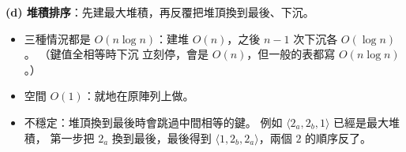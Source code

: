 \begin{pastsoln}
\textbf{(d) 堆積排序}：先建最大堆積，再反覆把堆頂換到最後、下沉。
\begin{itemize}
\item 三種情況都是 $O(n \log n)$：建堆 $O(n)$，之後 $n - 1$ 次下沉各 $O(\log n)$。 （鍵值全相等時下沉
立刻停，會是 $O(n)$，但一般的表都寫 $O(n \log n)$。）
\item 空間 $O(1)$：就地在原陣列上做。
\item 不穩定：堆頂換到最後時會跳過中間相等的鍵。 例如 $\langle 2_a, 2_b, 1\rangle$ 已經是最大堆積，
第一步把 $2_a$ 換到最後，最後得到 $\langle 1, 2_b, 2_a\rangle$，兩個 $2$ 的順序反了。
\end{itemize}
\end{pastsoln}
